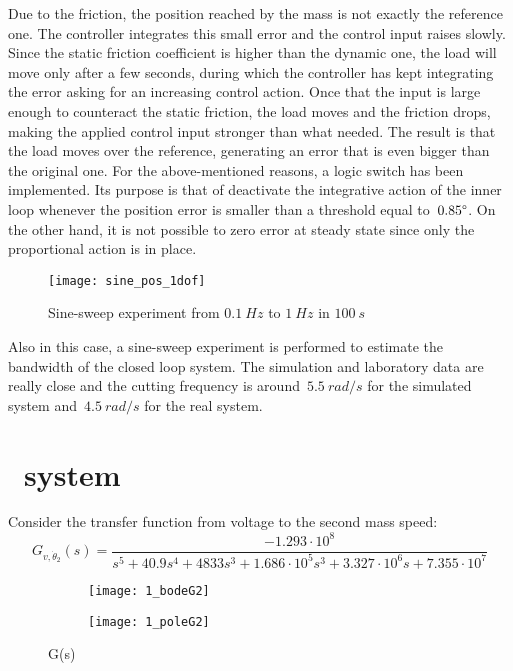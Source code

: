 \newpage
Due to the friction, the position reached by the mass is not exactly the reference one. The controller integrates this small error and the control input raises slowly. Since the static friction coefficient is higher than the dynamic one, the load will move only after a few seconds, during which the controller has kept integrating the error asking for an increasing control action.
Once that the input is large enough to counteract the static friction, the load moves and the friction drops, making the applied control input stronger than what needed. The result is that the load moves over the reference, generating an error that is even bigger than the original one.
For the above-mentioned reasons, a logic switch has been implemented. Its purpose is that of deactivate the integrative action of the inner loop whenever the position error is smaller than a threshold equal to~$0.85 \degree$. On the other hand, it is not possible to zero error at steady state since only the proportional action is in place.
\begin{figure*}[h]
	\centering
	\texttt{[image: sine\_pos\_1dof]}
	\caption{Sine-sweep experiment from $0.1\ Hz$ to $1\ Hz$ in $100\ s$}
	\label{fig:sinesweep_pos_1dof}
\end{figure*}

Also in this case, a sine-sweep experiment is performed to estimate the bandwidth of the closed loop system. The simulation and laboratory data are really close and the cutting frequency is around~$5.5\ rad/s$ for the simulated system and~$4.5\ rad/s$ for the real system.

\section{\twodof\ system}
Consider the transfer function from voltage to the second mass speed:
\[
G_{v,\dot{\theta}_2}(s)=
\frac{-1.293 \cdot 10^{8}}{s^5+40.9s^{4}+4833s^{3}+1.686 \cdot 10^{5} s^{3}+3.327 \cdot 10^{6} s+7.355 \cdot 10^{7}}
\]

\begin{figure*}[h]
	\centering
	\begin{subfigure}{0.4\columnwidth}
		\texttt{[image: 1\_bodeG2]}
	\end{subfigure}
	\begin{subfigure}{0.4\columnwidth}
		\texttt{[image: 1\_poleG2]}
	\end{subfigure}
	\caption{G(s)}
	\label{fig:G(s)2dof}
\end{figure*}

